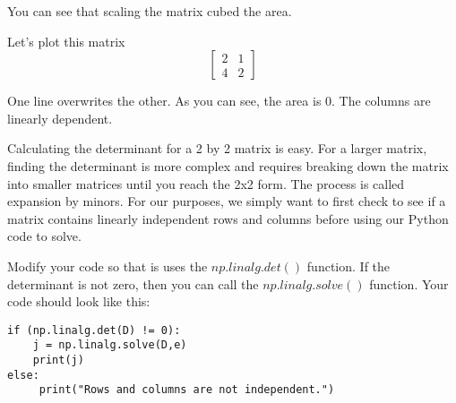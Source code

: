 You can see that scaling the matrix cubed the area.

 
Let's plot this matrix
$$
\begin{bmatrix}
2 & 1  \\
4 & 2 
\end{bmatrix}
$$


One line overwrites the other. As you can see, the area is 0. The columns are 
linearly dependent.

Calculating the determinant for a 2 by 2 matrix is easy. For a larger matrix, 
finding the determinant is more complex and requires breaking down the matrix 
into smaller matrices until you reach the 2x2 form. The process is called 
expansion by minors. For our purposes, we simply want to first check to see if 
a matrix contains linearly independent rows and columns before using our 
Python code to solve. 

Modify your code so that is uses the $np.linalg.det()$ function. If the 
determinant is not zero, then you can call the $np.linalg.solve()$ function. 
Your code should look like this:
\begin{Verbatim}
if (np.linalg.det(D) != 0):
    j = np.linalg.solve(D,e)
    print(j)
else:
     print("Rows and columns are not independent.")
\end{Verbatim}

